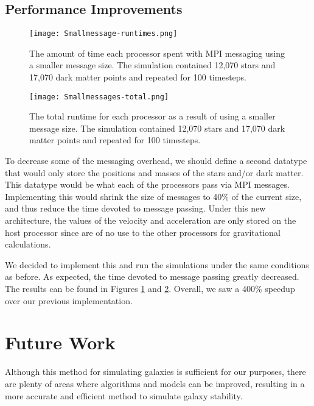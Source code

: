 \documentclass{article}
\begin{document}
\subsection{Performance Improvements}

\begin{figure}
\centering
\texttt{[image: Smallmessage-runtimes.png]}
\caption{The amount of time each processor spent with MPI messaging using a smaller message size. The simulation contained 12,070 stars and 17,070 dark matter points and repeated for 100 timesteps. \label{fig:Smallmessages-runtimes}}
\end{figure} 

\begin{figure}
\centering
\texttt{[image: Smallmessages-total.png]}
\caption{The total runtime for each processor as a result of using a smaller message size. The simulation contained 12,070 stars and 17,070 dark matter points and repeated for 100 timesteps. \label{fig:Smallmessages-total}}
\end{figure} 
 
To decrease some of the messaging overhead, we should define a second datatype that would only store the positions and masses of the stars and/or dark matter.  This datatype would be what each of the processors pass via MPI messages.  Implementing this would shrink the size of messages to 40\% of the current size, and thus reduce the time devoted to message passing.  Under this new architecture, the values of the velocity and acceleration are only stored on the host processor since are of no use to the other processors for gravitational calculations.  

We decided to implement this and run the simulations under the same conditions as before.  As expected, the time devoted to message passing greatly decreased.  The results can be found in Figures \ref{fig:Smallmessages-runtimes} and \ref{fig:Smallmessages-total}.  Overall, we saw a 400\% speedup over our previous implementation.

\section{Future Work}

Although this method for simulating galaxies is sufficient for our purposes, there are plenty of areas where algorithms and models can be improved, resulting in a more accurate and efficient method to simulate galaxy stability.
\end{document}
